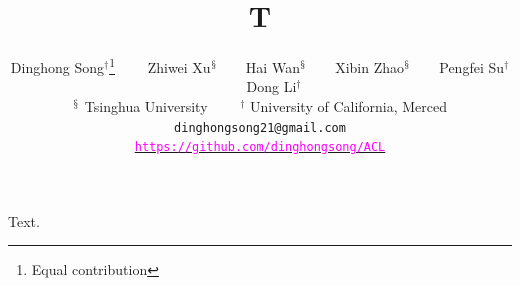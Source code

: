 \documentclass{article}
\title{T}
\author{
Dinghong Song$^{\dagger}$\thanks{Equal contribution} \ \ \ \ Zhiwei Xu$^\mathsection$\ \ \ \ Hai Wan$^\mathsection$\ \ \ \ Xibin Zhao$^\mathsection$\ \ \ \ Pengfei Su$^{\dagger}$ \ \ \ \ Dong Li$^{\dagger}$
\\
$^\mathsection$ Tsinghua University \ \ \ \ $^\dagger$ University of California, Merced \\
\texttt{dinghongsong21@gmail.com}
\\
\href{https://github.com/dinghongsong/ACL}{\textcolor{magenta}{\texttt{https://github.com/dinghongsong/ACL}}}
\url{}
}
\begin{document}
\maketitle
Text.
\end{document}
